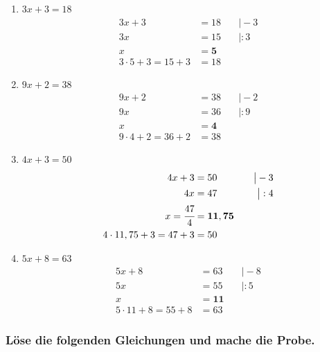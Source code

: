 \documentclass[a4paper,10pt]{article} %
\begin{document}
\begin{enumerate}[label=\alph*)]
  \item \(3x + 3 = 18\)
  \[
  \begin{aligned}
    3x + 3 &= 18 &\quad\big| - 3 \\
    3x &= 15 &\quad\big| : 3 \\
    x &= \mathbf{5} \\
    3 \cdot 5 + 3 = 15 + 3 &= 18
  \end{aligned}
  \]

  \item \(9x + 2 = 38\)
  \[
  \begin{aligned}
    9x + 2 &= 38 &\quad\big| - 2 \\
    9x &= 36 &\quad\big| : 9 \\
    x &= \mathbf{4} \\
    9 \cdot 4 + 2 = 36 + 2 &= 38
  \end{aligned}
  \]

  \item \(4x + 3 = 50\)
  \[
  \begin{aligned}
    4x + 3 &= 50 &\quad\big| - 3 \\
    4x &= 47 &\quad\big| : 4 \\
    x = \cfrac{47}{4} &= \mathbf{11,75} \\
    4 \cdot 11,75 + 3 = 47 + 3 &= 50
  \end{aligned}
  \]

  \item \(5x + 8 = 63\)
  \[
  \begin{aligned}
    5x + 8 &= 63 &\quad\big| - 8 \\
    5x &= 55 &\quad\big| : 5 \\
    x &= \mathbf{11} \\
    5 \cdot 11 + 8 = 55 + 8 &= 63
  \end{aligned}
  \]

\end{enumerate}

\subsubsection{Löse die folgenden Gleichungen und mache die Probe.} %
\end{document}
